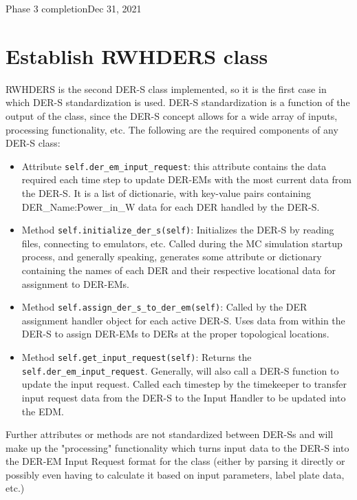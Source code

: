 \begin{entry}{Phase 3 completion}{Dec 31, 2021}
    \section*{Establish RWHDERS class}
    RWHDERS is the second DER-S class implemented, so it is the first case in which DER-S standardization is used. DER-S
    standardization is a function of the output of the class, since the DER-S concept allows for a wide array of inputs,
    processing functionality, etc. The following are the required components of any DER-S class:
    \begin{itemize}
        \item Attribute \verb|self.der_em_input_request|: this attribute contains the data required each time step to
            update DER-EMs with the most current data from the DER-S. It is a list of dictionarie, with key-value pairs
            containing {DER_Name:Power_in_W} data for each DER handled by the DER-S.
        \item Method \verb|self.initialize_der_s(self)|: Initializes the DER-S by reading files, connecting to emulators,
            etc. Called during the MC simulation startup process, and generally speaking, generates some attribute or
            dictionary containing the names of each DER and their respective locational data for assignment to DER-EMs.
        \item Method \verb|self.assign_der_s_to_der_em(self)|: Called by the DER assignment handler object for each
            active DER-S. Uses data from within the DER-S to assign DER-EMs to DERs at the proper topological locations.
        \item Method \verb|self.get_input_request(self)|: Returns the \verb|self.der_em_input_request|. Generally, will
            also call a DER-S function to update the input request. Called each timestep by the timekeeper to transfer
            input request data from the DER-S to the Input Handler to be updated into the EDM.
    \end{itemize}
    Further attributes or methods are not standardized between DER-Ss and will make up the "processing" functionality
    which turns input data to the DER-S into the DER-EM Input Request format for the class (either by parsing it directly
    or possibly even having to calculate it based on input parameters, label plate data, etc.)


\end{entry}
